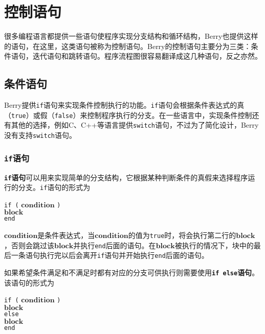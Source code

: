 \chapter{控制语句}

很多编程语言都提供一些语句使程序实现分支结构和循环结构，Berry也提供这样的语句，在这里，这类语句被称为控制语句。Berry的控制语句主要分为三类：条件语句，迭代语句和跳转语句。程序流程图很容易翻译成这几种语句，反之亦然。

\section{条件语句}

Berry提供\texttt{if}语句来实现条件控制执行的功能。\texttt{if}语句会根据条件表达式的真（\texttt{true}）或假（\texttt{false}）来控制程序执行的分支。在一些语言中，实现条件控制还有其他的选择，例如C、C++等语言提供\texttt{switch}语句，不过为了简化设计，Berry没有支持\texttt{switch}语句。

\subsection{\texttt{if}语句}

\textbf{\texttt{if}语句}可以用来实现简单的分支结构，它根据某种判断条件的真假来选择程序运行的分支。\texttt{if}语句的形式为

\begin{algorithm}
    \texttt{if (} $\bm{condition}$ \texttt{)} \\
    \qquad $\bm{block}$ \\
    \texttt{end}
\end{algorithm}

$\bm{condition}$是条件表达式，当$\bm{condition}$的值为\texttt{true}时，将会执行第二行的$\bm{block}$，否则会跳过该$\bm{block}$并执行\texttt{end}后面的语句。在$\bm{block}$被执行的情况下，块中的最后一条语句执行完以后会离开\texttt{if}语句并开始执行\texttt{end}后面的语句。

如果希望条件满足和不满足时都有对应的分支可供执行则需要使用\textbf{\texttt{if else}语句}。该语句的形式为
\begin{algorithm}
    \texttt{if (} $\bm{condition}$ \texttt{)} \\
        \qquad $\bm{block}$ \\
    \texttt{else} \\
        \qquad $\bm{block}$ \\
    \texttt{end}
\end{algorithm}

